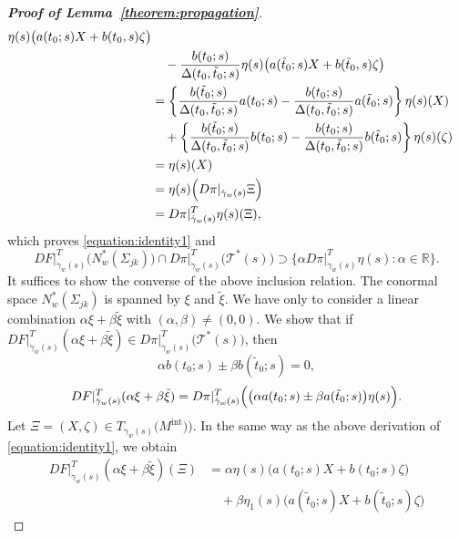 \documentclass[a4paper,11pt,reqno]{amsart}
\numberwithin{equation}{section}
\theoremstyle{definition}
\theoremstyle{remark}
\begin{document}
\begin{proof}[{\bf Proof of Lemma~\ref{theorem:propagation}}]
\begin{align*}
  \eta(s)
  \bigl(a(t_0;s)X+b(t_0,s)\zeta\bigr)
\\
& \quad -
  \frac{b(t_0;s)}{\Delta(t_0,\tilde{t}_0;s)}
  \eta(s)
  \bigl(a(\tilde{t}_0;s)X+b(\tilde{t}_0,s)\zeta\bigr)
\\
& =
  \left\{
  \frac{b(\tilde{t}_0;s)}{\Delta(t_0,\tilde{t}_0;s)}a(t_0;s)
  -
  \frac{b(t_0;s)}{\Delta(t_0,\tilde{t}_0;s)}a(\tilde{t}_0;s)
  \right\}
  \eta(s)(X)
\\
& \quad +
  \left\{
  \frac{b(\tilde{t}_0;s)}{\Delta(t_0,\tilde{t}_0;s)}b(t_0;s)
  -
  \frac{b(t_0;s)}{\Delta(t_0,\tilde{t}_0;s)}b(\tilde{t}_0;s)
  \right\}
  \eta(s)(\zeta)
\\
& =
  \eta(s)(X)
\\
& =
  \eta(s)\Bigl(D\pi\vert_{\dot{\gamma}_w(s)}\Xi\Bigr)
  \\
& =
  D\pi\vert^T_{\dot{\gamma}_w(s)}\eta(s)(\Xi),  
\end{align*} 
%
%
which proves \eqref{equation:identity1} and 
%
%
$$
DF\vert^T_{\dot{\gamma}_w(s)}\bigl(N^\ast_w(\Sigma_{jk})\bigr)
\cap
D\pi\vert^T_{\dot{\gamma}_w(s)}\bigl(\mathcal{T}^\ast(s)\bigr)
\supset
\{\alpha D\pi\vert^T_{\dot{\gamma}_w(s)}\eta(s) : \alpha\in\mathbb{R}\}. 
$$
%
%
It suffices to show the converse of the above inclusion relation. 
The conormal space $N^\ast_w(\Sigma_{jk})$ 
is spanned by $\xi$ and $\tilde{\xi}$. 
We have only to consider a linear combination 
$\alpha\xi+\beta\tilde{\xi}$ with $(\alpha,\beta)\ne(0,0)$. 
We show that if 
$DF\vert^T_{\dot{\gamma}_w(s)}(\alpha\xi+\beta\tilde{\xi}) \in D\pi\vert^T_{\dot{\gamma}_w(s)}\bigl(\mathcal{T}^\ast(s)\bigr)$, then 
%
%
\begin{equation}
\alpha b(t_0;s) \pm \beta b(\tilde{t}_0;s)=0, 
\label{equation:zerozero1} 
\end{equation}
%
%
\begin{equation}
DF\vert^T_{\dot{\gamma}_w(s)}(\alpha\xi+\beta\tilde{\xi})
=
D\pi\vert^T_{\dot{\gamma}_w(s)}
\Bigl(
\bigl(\alpha a(t_0;s)\pm \beta a(\tilde{t}_0;s)\bigr)
\eta(s)
\Bigr). 
\label{equation:zerozero2} 
\end{equation}
%
%
Let $\Xi=(X,\zeta) \in T_{\dot{\gamma}_w(s)}\bigl(M^\text{int})\bigr)$. 
In the same way as the above derivation of \eqref{equation:identity1}, 
we obtain 
%
%
\begin{align}
  DF\vert^T_{\dot{\gamma}_w(s)}(\alpha\xi+\beta\tilde{\xi})(\Xi)
& =
  \alpha\eta(s)\bigl(a(t_0;s)X+b(t_0;s)\zeta\bigr)
\nonumber
\\
& \quad +
  \beta\eta_1(s)\bigl(a(\tilde{t}_0;s)X+b(\tilde{t}_0;s)\zeta\bigr) 

\end{align}
\end{proof}
\end{document}
